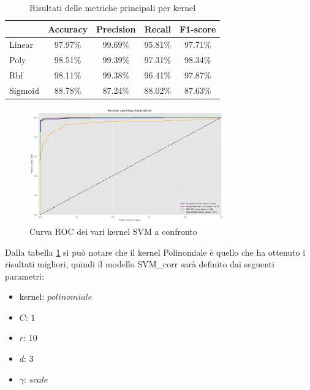 \begin{table}[!ht]
    \centering
    \begin{tabular}{@{}lcccc@{}}
        \toprule
        \rowcolor[HTML]{EFEFEF}
        \multicolumn{1}{c}{\cellcolor[HTML]{EFEFEF}\textbf{kernel}} & \textbf{Accuracy} & \textbf{Precision} & \textbf{Recall} & \textbf{F1-score} \\ \midrule
        Linear                                                      & 97.97\%           & 99.69\%            & 95.81\%         & 97.71\%           \\
        Poly                                                        & 98.51\%           & 99.39\%            & 97.31\%         & 98.34\%           \\
        Rbf                                                         & 98.11\%           & 99.38\%            & 96.41\%         & 97.87\%           \\
        Sigmoid                                                     & 88.78\%           & 87.24\%            & 88.02\%         & 87.63\%           \\ \bottomrule
    \end{tabular}
    \caption{Risultati delle metriche principali per kernel}
    \label{tab:top_metrics_kernels_corr}
\end{table}
\begin{figure}[!ht]
    \centering
    \includegraphics[width=0.75\textwidth]{img/svm/roc_SVM.png}
    \caption{Curva ROC dei vari kernel SVM a confronto}
    \label{fig:roc_SVM_corr}
\end{figure}

Dalla tabella \ref{tab:top_metrics_kernels_corr} si può notare che il kernel Polinomiale
è quello che ha ottenuto i risultati migliori, quindi il modello SVM\_corr sarà
definito dai seguenti parametri: 
\begin{itemize}
    \item kernel: $polinomiale$
    \item $C$: $1$
    \item $r$: $10$
    \item $d$: $3$
    \item $\gamma$: $scale$
\end{itemize}

